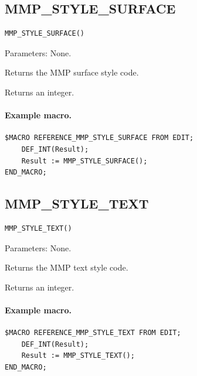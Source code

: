 \documentclass[a4paper,10pt,twoside,openany]{book}
\newenvironment{mrmacextension}{\begin{changebar}}{\end{changebar}}
\begin{document}
\begin{mrmacextension}
\label{prim:intrinsic-mmp-style-surface}
\subsection*{MMP\_STYLE\_SURFACE}
\begin{verbatim}
MMP_STYLE_SURFACE()
\end{verbatim}
Parameters: None.

Returns the MMP surface style code.

Returns an integer.

\paragraph{Example macro.}
\begin{verbatim}
$MACRO REFERENCE_MMP_STYLE_SURFACE FROM EDIT;
    DEF_INT(Result);
    Result := MMP_STYLE_SURFACE();
END_MACRO;
\end{verbatim}
\end{mrmacextension}

\begin{mrmacextension}
\label{prim:intrinsic-mmp-style-text}
\subsection*{MMP\_STYLE\_TEXT}
\begin{verbatim}
MMP_STYLE_TEXT()
\end{verbatim}
Parameters: None.

Returns the MMP text style code.

Returns an integer.

\paragraph{Example macro.}
\begin{verbatim}
$MACRO REFERENCE_MMP_STYLE_TEXT FROM EDIT;
    DEF_INT(Result);
    Result := MMP_STYLE_TEXT();
END_MACRO;
\end{verbatim}
\end{mrmacextension}
\end{document}
